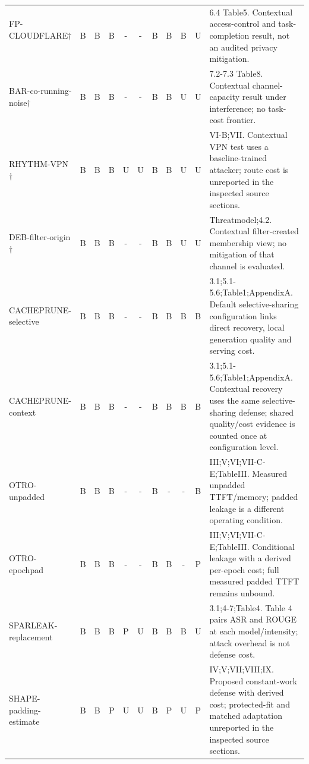 \begin{longtable}{@{}p{}*{9}{c}p{}@{}}
FP-\allowbreak{}CLOUDFLARE$\dagger$~\cite{wang2026fpagent} & B & B & B & - & - & B & B & B & U & 6.4 Table5. Contextual access-control and task-completion result, not an audited privacy mitigation.\\
BAR-\allowbreak{}co-\allowbreak{}running-\allowbreak{}noise$\dagger$~\cite{gu2026behindbars} & B & B & B & - & - & B & B & U & U & 7.2-7.3 Table8. Contextual channel-capacity result under interference; no task-cost frontier.\\
RHYTHM-\allowbreak{}VPN$\dagger$~\cite{alhazbi2025rhythm} & B & B & B & U & U & B & B & U & U & VI-B;VII. Contextual VPN test uses a baseline-trained attacker; route cost is unreported in the inspected source sections.\\
DEB-\allowbreak{}filter-\allowbreak{}origin$\dagger$~\cite{debenedetti2024privacy} & B & B & B & - & - & B & B & U & U & Threatmodel;4.2. Contextual filter-created membership view; no mitigation of that channel is evaluated.\\
CACHEPRUNE-\allowbreak{}selective~\cite{wu2026cacheprune} & B & B & B & - & - & B & B & B & B & 3.1;5.1-5.6;Table1;AppendixA. Default selective-sharing configuration links direct recovery, local generation quality and serving cost.\\
CACHEPRUNE-\allowbreak{}context~\cite{wu2026cacheprune} & B & B & B & - & - & B & B & B & B & 3.1;5.1-5.6;Table1;AppendixA. Contextual recovery uses the same selective-sharing defense; shared quality/cost evidence is counted once at configuration level.\\
OTRO-\allowbreak{}unpadded~\cite{lee2026otro} & B & B & B & - & - & B & - & - & B & III;V;VI;VII-C-E;TableIII. Measured unpadded TTFT/memory; padded leakage is a different operating condition.\\
OTRO-\allowbreak{}epochpad~\cite{lee2026otro} & B & B & B & - & - & B & B & - & P & III;V;VI;VII-C-E;TableIII. Conditional leakage with a derived per-epoch cost; full measured padded TTFT remains unbound.\\
SPARLEAK-\allowbreak{}replacement~\cite{chen2026sparleak} & B & B & B & P & U & B & B & B & U & 3.1;4-7;Table4. Table 4 pairs ASR and ROUGE at each model/intensity; attack overhead is not defense cost.\\
SHAPE-\allowbreak{}padding-\allowbreak{}estimate~\cite{hadad2026shape} & B & B & P & U & U & B & P & U & P & IV;V;VII;VIII;IX. Proposed constant-work defense with derived cost; protected-fit and matched adaptation unreported in the inspected source sections.\\
\end{longtable}
